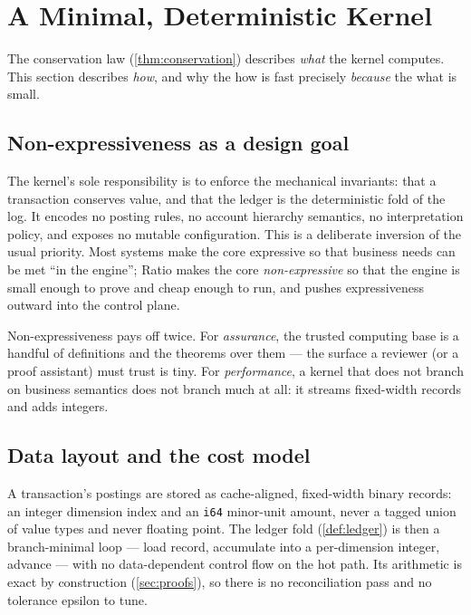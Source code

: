 \section{A Minimal, Deterministic Kernel}
\label{sec:kernel}

The conservation law (\cref{thm:conservation}) describes \emph{what} the
kernel computes. This section describes \emph{how}, and why the
how is fast precisely \emph{because} the what is small.

\subsection{Non-expressiveness as a design goal}

The kernel's sole responsibility is to enforce the mechanical
invariants: that a transaction conserves value, and that the ledger is
the deterministic fold of the log. It encodes no posting rules, no
account hierarchy semantics, no interpretation policy, and exposes no
mutable configuration. This is a deliberate inversion of the usual
priority. Most systems make the core expressive so that business needs
can be met ``in the engine''; Ratio makes the core \emph{non-expressive}
so that the engine is small enough to prove and cheap enough to run, and
pushes expressiveness outward into the control plane.

Non-expressiveness pays off twice. For \emph{assurance}, the trusted
computing base is a handful of definitions and the theorems over them ---
the surface a reviewer (or a proof assistant) must trust is tiny. For
\emph{performance}, a kernel that does not branch on business semantics
does not branch much at all: it streams fixed-width records and adds
integers.

\subsection{Data layout and the cost model}

A transaction's postings are stored as cache-aligned, fixed-width binary
records: an integer dimension index and an \texttt{i64} minor-unit
amount, never a tagged union of value types and never floating point.
The ledger fold (\cref{def:ledger}) is then a branch-minimal loop ---
load record, accumulate into a per-dimension integer, advance --- with no
data-dependent control flow on the hot path. Its arithmetic is exact by
construction (\cref{sec:proofs}), so there is no reconciliation pass and
no tolerance epsilon to tune.

